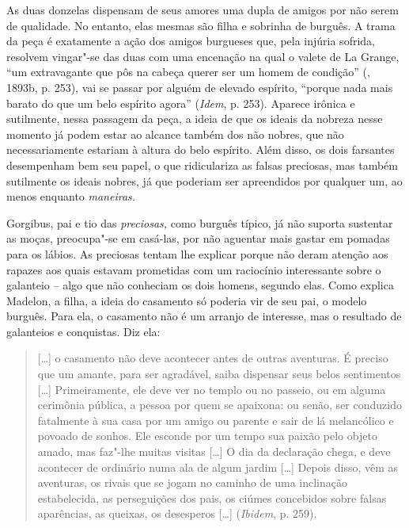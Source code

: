 As duas donzelas dispensam de seus amores uma dupla de amigos por não
serem de qualidade. No entanto, elas mesmas são filha e sobrinha de
burguês. A trama da peça é exatamente a ação dos amigos burgueses que,
pela injúria sofrida, resolvem vingar"-se das duas com uma encenação na
qual o valete de La Grange, ``um extravagante que pôs na cabeça querer
ser um homem de condição'' (, 1893b, p. 253), vai se passar por
alguém de elevado espírito, ``porque nada mais barato do que um belo
espírito agora'' (\emph{Idem}, p. 253). Aparece irônica e sutilmente,
nessa passagem da peça, a ideia de que os ideais da nobreza nesse
momento já podem estar ao alcance também dos não nobres, que não
necessariamente estariam à altura do belo espírito. Além disso, os dois
farsantes desempenham bem seu papel, o que ridiculariza as falsas
preciosas, mas também sutilmente os ideais nobres, já que poderiam ser
apreendidos por qualquer um, ao menos enquanto \emph{maneiras.}

Gorgibus, pai e tio das \emph{preciosas,} como burguês típico, já não
suporta sustentar as moças, preocupa"-se em casá-las, por não aguentar
mais gastar em pomadas para os lábios. As preciosas tentam lhe explicar
porque não deram atenção aos rapazes aos quais estavam prometidas com um
raciocínio interessante sobre o galanteio -- algo que não conheciam os
dois homens, segundo elas. Como explica Madelon, a filha, a ideia do
casamento só poderia vir de seu pai, o modelo burguês. Para ela, o
casamento não é um arranjo de interesse, mas o resultado de galanteios e
conquistas. Diz ela:

\begin{quote}
[\ldots{}] o casamento não deve acontecer antes de outras aventuras.
É preciso que um amante, para ser agradável, saiba dispensar seus belos
sentimentos [\ldots{}] Primeiramente, ele deve ver no templo ou no
passeio, ou em alguma cerimônia pública, a pessoa por quem se apaixona:
ou senão, ser conduzido fatalmente à sua casa por um amigo ou parente e
sair de lá melancólico e povoado de sonhos. Ele esconde por um tempo sua
paixão pelo objeto amado, mas faz"-lhe muitas visitas [\ldots{}] O
dia da declaração chega, e deve acontecer de ordinário numa ala de algum
jardim [\ldots{}] Depois disso, vêm as aventuras, os rivais que se
jogam no caminho de uma inclinação estabelecida, as perseguições dos
pais, os ciúmes concebidos sobre falsas aparências, as queixas, os
desesperos [\ldots{}] (\emph{Ibidem}, p. 259).
\end{quote}

